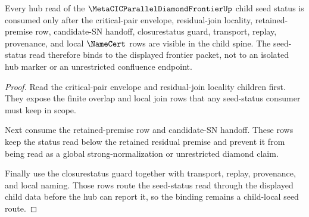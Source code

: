\begin{theorem}
\label{thm:metacic-parallel-diamond-child-seed}
Every hub read of the $\MetaCICParallelDiamondFrontierUp$ child seed status is consumed only after the critical-pair envelope, residual-join locality, retained-premise row, candidate-SN handoff, closurestatus guard, transport, replay, provenance, and local $\NameCert$ rows are visible in the child spine. The seed-status read therefore binds to the displayed frontier packet, not to an isolated hub marker or an unrestricted confluence endpoint.
\end{theorem}
\begin{proof}
Read the critical-pair envelope and residual-join locality children first. They expose the finite overlap and local join rows that any seed-status consumer must keep in scope.

Next consume the retained-premise row and candidate-SN handoff. These rows keep the status read below the retained residual premise and prevent it from being read as a global strong-normalization or unrestricted diamond claim.

Finally use the closurestatus guard together with transport, replay, provenance, and local naming. Those rows route the seed-status read through the displayed child data before the hub can report it, so the binding remains a child-local seed route.
\end{proof}

